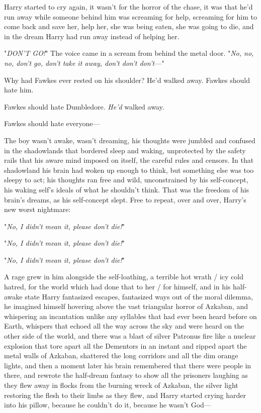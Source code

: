 Harry started to cry again, it wasn't for the horror of the chase, it was that
he'd run away while someone behind him was screaming for help, screaming for
him to come back and save her, help her, she was being eaten, she was going to
die, and in the dream Harry had run away instead of helping her.

"\emph{DON'T GO!}" The voice came in a scream from behind the metal door. "\emph{No, no, no, don't go, don't take it away, don't don't don't—}"

Why had Fawkes ever rested on his shoulder? He'd walked away. Fawkes should
hate him.

Fawkes should hate Dumbledore. \emph{He'd} walked away.

Fawkes should hate everyone—

The boy wasn't awake, wasn't dreaming, his thoughts were jumbled and confused
in the shadowlands that bordered sleep and waking, unprotected by the safety
rails that his aware mind imposed on itself, the careful rules and censors. In
that shadowland his brain had woken up enough to think, but something else was
too sleepy to act; his thoughts ran free and wild, unconstrained by his
self-concept, his waking self's ideals of what he shouldn't think. That was the
freedom of his brain's dreams, as his self-concept slept. Free to repeat, over
and over, Harry's new worst nightmare:

"\emph{No, I didn't mean it, please don't die!}"

"\emph{No, I didn't mean it, please don't die!}"

"\emph{No, I didn't mean it, please don't die!}"

A rage grew in him alongside the self-loathing, a terrible hot wrath / icy cold
hatred, for the world which had done that to her / for himself, and in his
half-awake state Harry fantasized escapes, fantasized ways out of the moral
dilemma, he imagined himself hovering above the vast triangular horror of
Azkaban, and whispering an incantation unlike any syllables that had ever been
heard before on Earth, whispers that echoed all the way across the sky and were
heard on the other side of the world, and there was a blast of silver Patronus
fire like a nuclear explosion that tore apart all the Dementors in an instant
and ripped apart the metal walls of Azkaban, shattered the long corridors and
all the dim orange lights, and then a moment later his brain remembered that
there were people in there, and rewrote the half-dream fantasy to show all the
prisoners laughing as they flew away in flocks from the burning wreck of
Azkaban, the silver light restoring the flesh to their limbs as they flew, and
Harry started crying harder into his pillow, because he couldn't do it, because
he wasn't God—

